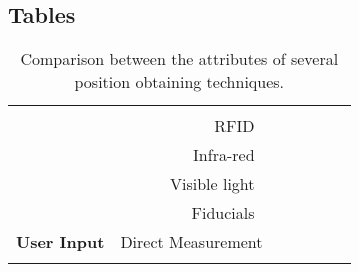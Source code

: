 \documentclass{bmcart}
\newcommand{\tickYes}{\checkmark}
\begin{document}
\begin{backmatter}

\section*{Tables}

\begin{table}[h!]
\centering
\caption{Comparison between the attributes of several position obtaining techniques.}
\begin{tabular}
{!{\vrule width 1.5pt}c|r!{\vrule width 1.5pt}c|c|c|c|c!{\vrule width 1.5pt}}
	& 
	& 
	&
	&
	&  \\
	&RFID~\cite{Ma2017}
	&\tickYes
	&\tickYes
	&\hspace{0.75cm}	
	&\hspace{0.75cm}	
	&\hspace{0.75cm} \\
	&Infra-red~\cite{Kortuem2005}
	&\hspace{0.75cm}	
	&\tickYes
	&\tickYes 
	&
	& \\
	&Visible light~\cite{Smith2013}
	&
	&\tickYes
	&\tickYes
	&
	&\tickYes \\
	&Fiducials~\cite{Sagitov2017}
	&
	&\tickYes
	&\tickYes
	&
	&\tickYes \\
	\textbf{User Input}
	&Direct Measurement
	&\tickYes
	&\hspace{0.75cm}	
	&\tickYes
	&\tickYes
	&\tickYes \\
\end{tabular}
\label{table:techniquesComparison}
\end{table}



\end{backmatter}
\end{document}
